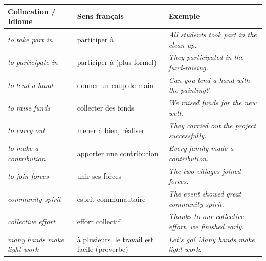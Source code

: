 \documentclass[11pt]{article}
\newcommand{\eng}[1]{\ifmmode\text{\textit{#1}}\else\begingroup\selectlanguage{english}\itshape #1\endgroup\fi}
\begin{document}
\begin{propriete}
\begin{center}
\begin{tabularx}{\linewidth}{|l|X|X|}
\hline
\rowcolor{popblueL} \textbf{Collocation / Idiome} & \textbf{Sens français} & \textbf{Exemple} \\
\hline
\eng{to take part in} & participer à & \eng{All students took part in the clean-up.} \\
\eng{to participate in} & participer à (plus formel) & \eng{They participated in the fund-raising.} \\
\eng{to lend a hand} & donner un coup de main & \eng{Can you lend a hand with the painting?} \\
\eng{to raise funds} & collecter des fonds & \eng{We raised funds for the new well.} \\
\eng{to carry out} & mener à bien, réaliser & \eng{They carried out the project successfully.} \\
\eng{to make a contribution} & apporter une contribution & \eng{Every family made a contribution.} \\
\eng{to join forces} & unir ses forces & \eng{The two villages joined forces.} \\
\eng{community spirit} & esprit communautaire & \eng{The event showed great community spirit.} \\
\eng{collective effort} & effort collectif & \eng{Thanks to our collective effort, we finished early.} \\
\eng{many hands make light work} & à plusieurs, le travail est facile (proverbe) & \eng{Let's go! Many hands make light work.} \\
\hline
\end{tabularx}
\end{center}
\end{propriete}
\end{document}
